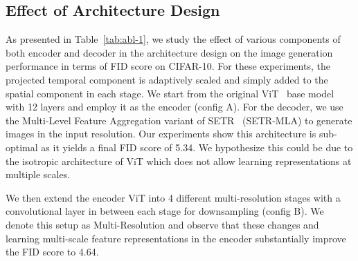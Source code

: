 \subsection{Effect of Architecture Design}
\label{sec:abl-effect}
As presented in Table~\ref{tab:abl-1}, we study the effect of various components of both encoder and decoder in the architecture design on the image generation performance in terms of FID score on CIFAR-10. For these experiments, the projected temporal component is adaptively scaled and simply added to the spatial component in each stage. We start from the original ViT~\cite{dosovitskiy2020image} base model with 12 layers and employ it as the encoder (config A). For the decoder, we use the Multi-Level Feature Aggregation variant of SETR~\cite{zheng2021rethinking} (SETR-MLA) to generate images in the input resolution. Our experiments show this architecture is sub-optimal as it yields a final FID score of 5.34. We hypothesize this could be due to the isotropic architecture of ViT which does not allow learning representations at multiple scales. 

\begin{table}
\centering
{}
    \caption{Ablation study on the effectiveness of encoder and decoder architecture.}
    \label{tab:abl-1}
\end{table}


We then extend the encoder ViT into 4 different multi-resolution stages with a convolutional layer in between each stage for downsampling (config B). We denote this setup as Multi-Resolution and observe that these changes and learning multi-scale feature representations in the encoder substantially improve the FID score to 4.64.

